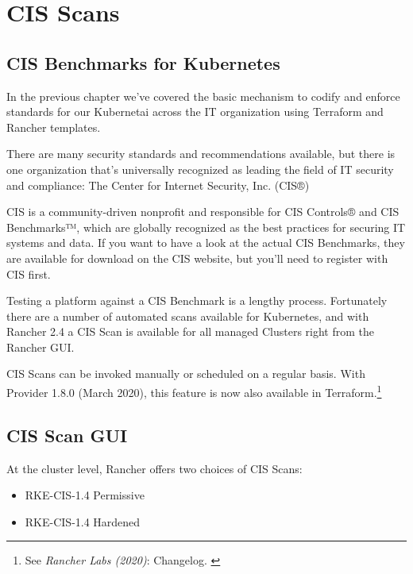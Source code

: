 %
%

\pagebreak
\section{CIS Scans}

\onehalfspacing

\subsection{CIS Benchmarks for Kubernetes}

In the previous chapter we've covered the basic mechanism to codify and enforce standards for our Kubernetai across the IT organization using Terraform and Rancher templates.

There are many security standards and recommendations available, but there is one organization that's universally recognized as leading the field of IT security and compliance: The Center for Internet Security, Inc. (CIS®)

CIS is a community-driven nonprofit and responsible for CIS Controls® and CIS Benchmarks™, which are globally recognized as the best practices for securing IT systems and data. If you want to have a look at the actual CIS Benchmarks, they are available for download on the CIS website, but you'll need to register with CIS first.

Testing a platform against a CIS Benchmark is a lengthy process. Fortunately there are a number of automated scans available for Kubernetes, and with Rancher 2.4 a CIS Scan is available for all managed Clusters right from the Rancher GUI.

CIS Scans can be invoked manually or scheduled on a regular basis. With Provider 1.8.0 (March 2020), this feature is now also available in Terraform.\footnote{See \textit{Rancher Labs (2020)}: Changelog. \cite{ChangeLog}}

\subsection{CIS Scan GUI}

At the cluster level, Rancher offers two choices of CIS Scans:

\begin{itemize}
\item RKE-CIS-1.4 Permissive
\item RKE-CIS-1.4 Hardened
\end{itemize}


